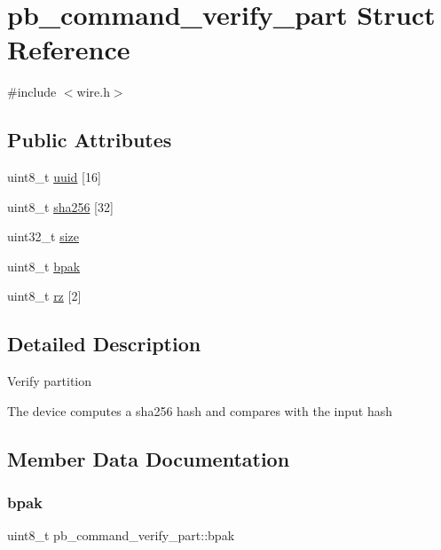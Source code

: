 \hypertarget{structpb__command__verify__part}{}\section{pb\+\_\+command\+\_\+verify\+\_\+part Struct Reference}
\label{structpb__command__verify__part}


{\ttfamily \#include $<$wire.\+h$>$}

\subsection*{Public Attributes}
\begin{DoxyCompactItemize}
\item 
uint8\+\_\+t \hyperlink{structpb__command__verify__part_a6ce15232d298fe6def0fee469d767f08}{uuid} \mbox{[}16\mbox{]}
\item 
uint8\+\_\+t \hyperlink{structpb__command__verify__part_a7e6ae274bb8d87efdecfb3c3ad26c041}{sha256} \mbox{[}32\mbox{]}
\item 
uint32\+\_\+t \hyperlink{structpb__command__verify__part_ac8ea38bcb00b9f1ff506140d69d2bdf6}{size}
\item 
uint8\+\_\+t \hyperlink{structpb__command__verify__part_ab86a640981402a2dcf3e90130d4da631}{bpak}
\item 
uint8\+\_\+t \hyperlink{structpb__command__verify__part_a21d981c6e7acedfa22e5c1390c4f64b1}{rz} \mbox{[}2\mbox{]}
\end{DoxyCompactItemize}


\subsection{Detailed Description}
Verify partition

The device computes a sha256 hash and compares with the input hash 

\subsection{Member Data Documentation}
\mbox{\label{structpb__command__verify__part_ab86a640981402a2dcf3e90130d4da631}} 
\subsubsection{\texorpdfstring{bpak}{bpak}}
{\footnotesize\ttfamily uint8\+\_\+t pb\+\_\+command\+\_\+verify\+\_\+part\+::bpak}

